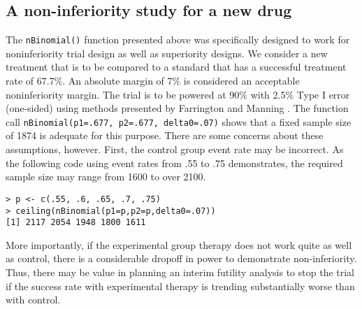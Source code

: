 \subsection{A non-inferiority study for a new drug\label{sec:motivationNI}}
The \texttt{nBinomial()} function presented above was specifically designed to work for noninferiority trial design as well as superiority designs.
We consider a new treatment that is to be compared to a standard that has a successful treatment rate of 67.7\%.
An absolute margin of 7\% is considered an acceptable noninferiority margin.
The trial is to be powered at 90\% with 2.5\% Type I error (one-sided) using methods presented by Farrington and Manning \cite{FarringtonManning}.
The function call \texttt{nBinomial(p1=.677, p2=.677, delta0=.07)} shows that a fixed sample size of 1874 is adequate for this purpose.
There are some concerns about these assumptions, however. 
First, the control group event rate may be incorrect.
As the following code using event rates from .55 to .75 demonstrates, the required sample size may range from 1600 to over 2100.
\begin{verbatim}
> p <- c(.55, .6, .65, .7, .75)
> ceiling(nBinomial(p1=p,p2=p,delta0=.07))
[1] 2117 2054 1948 1800 1611
\end{verbatim}
More importantly, if the experimental group therapy does not work quite as well as control, there is a considerable dropoff in power to demonstrate non-inferiority.
Thus, there may be value in planning an interim futility analysis to stop the trial if the success rate with experimental therapy is trending substantially worse than with control.

